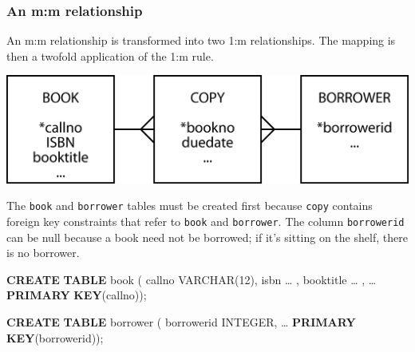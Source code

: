 \documentclass[
]{article}
\newenvironment{Shaded}{\begin{snugshade}}{\end{snugshade}}
\newcommand{\DataTypeTok}[1]{\textcolor[rgb]{0.13,0.29,0.53}{#1}}
\newcommand{\DecValTok}[1]{\textcolor[rgb]{0.00,0.00,0.81}{#1}}
\newcommand{\KeywordTok}[1]{\textcolor[rgb]{0.13,0.29,0.53}{\textbf{#1}}}
\newcommand{\NormalTok}[1]{#1}
\begin{document}
\hypertarget{an-mm-relationship}{%
\subsubsection*{An m:m relationship}\label{an-mm-relationship}}

An m:m relationship is transformed into two 1:m relationships. The
mapping is then a twofold application of the 1:m rule.

\includegraphics[width=6.25in,height=\textheight]{Figures/Reference 1/r1-book-copy-borrow.png}

The \texttt{book} and \texttt{borrower} tables must be created first because \texttt{copy}
contains foreign key constraints that refer to \texttt{book} and \texttt{borrower}.
The column \texttt{borrowerid} can be null because a book need not be borrowed;
if it's sitting on the shelf, there is no borrower.

\begin{Shaded}
\begin{Highlighting}[]
\KeywordTok{CREATE} \KeywordTok{TABLE}\NormalTok{ book (}
\NormalTok{    callno      }\DataTypeTok{VARCHAR}\NormalTok{(}\DecValTok{12}\NormalTok{),}
\NormalTok{    isbn            … ,}
\NormalTok{    booktitle       … ,}
\NormalTok{    …}
        \KeywordTok{PRIMARY} \KeywordTok{KEY}\NormalTok{(callno));}
\end{Highlighting}
\end{Shaded}

\begin{Shaded}
\begin{Highlighting}[]
\KeywordTok{CREATE} \KeywordTok{TABLE}\NormalTok{ borrower (}
\NormalTok{    borrowerid      }\DataTypeTok{INTEGER}\NormalTok{,}
\NormalTok{        …}
        \KeywordTok{PRIMARY} \KeywordTok{KEY}\NormalTok{(borrowerid));}
\end{Highlighting}
\end{Shaded}
\end{document}
